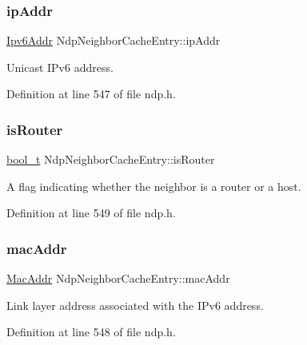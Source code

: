\subsubsection{\texorpdfstring{ip\+Addr}{ipAddr}}
{\footnotesize\ttfamily \hyperlink{ipv6_8h_aed0cbc40c61ed5b4fb681ebc55237e89}{Ipv6\+Addr} Ndp\+Neighbor\+Cache\+Entry\+::ip\+Addr}



Unicast I\+Pv6 address. 



Definition at line 547 of file ndp.\+h.

\mbox{\label{structNdpNeighborCacheEntry_af1bf52654360db588714ce7c21e20887}} 
\subsubsection{\texorpdfstring{is\+Router}{isRouter}}
{\footnotesize\ttfamily \hyperlink{compiler__port_8h_a812d16e5494522586b3784e55d479912}{bool\+\_\+t} Ndp\+Neighbor\+Cache\+Entry\+::is\+Router}



A flag indicating whether the neighbor is a router or a host. 



Definition at line 549 of file ndp.\+h.

\mbox{\label{structNdpNeighborCacheEntry_a1e8f8ff5e8f92123bb81a40643b13c2c}} 
\subsubsection{\texorpdfstring{mac\+Addr}{macAddr}}
{\footnotesize\ttfamily \hyperlink{ethernet_8h_a1e00ed3977e8a770e8b4ae4cb306d1c0}{Mac\+Addr} Ndp\+Neighbor\+Cache\+Entry\+::mac\+Addr}



Link layer address associated with the I\+Pv6 address. 



Definition at line 548 of file ndp.\+h.

\mbox{\label{structNdpNeighborCacheEntry_a96ee1ce22a34ce6fbe999554aed2ec3d}} 
